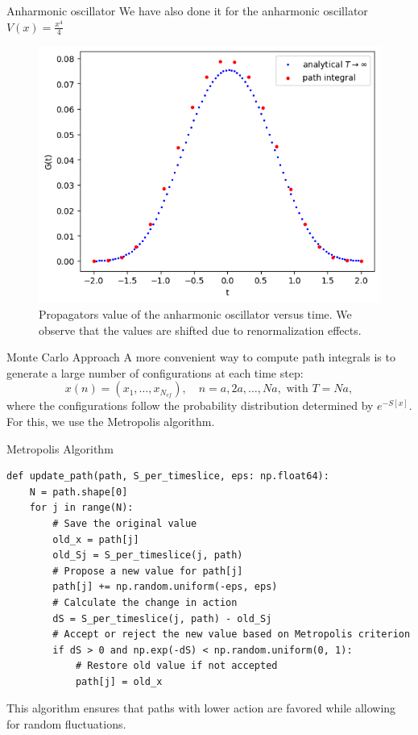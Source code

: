\documentclass{beamer}
\begin{document}
\begin{frame}{Anharmonic oscillator}
    We have also done it for the anharmonic oscillator $V(x) = \frac{x^4}{4}$
    \begin{figure}
        \centering
        \includegraphics[width=0.5\linewidth]{anharmonic_oscillator_numerical.png}
        \caption{Propagators value of the anharmonic oscillator versus time. We observe that the values are shifted due to renormalization effects.}
        \label{fig:enter-label}
    \end{figure}
\end{frame}
\begin{frame}{Monte Carlo Approach}
    A more convenient way to compute path integrals is to generate a large number of configurations at each time step:
    \[
    x(n) = (x_1, \dots, x_{N_{cf}}), \quad n = a, 2a, \dots, Na, \text{ with } T = Na,
    \]
    where the configurations follow the probability distribution determined by $e^{-S[x]}$. For this, we use the Metropolis algorithm.
\end{frame}

\begin{frame}[fragile]{Metropolis Algorithm}
        \begin{verbatim}
def update_path(path, S_per_timeslice, eps: np.float64):
    N = path.shape[0]
    for j in range(N):
        # Save the original value
        old_x = path[j]
        old_Sj = S_per_timeslice(j, path)
        # Propose a new value for path[j]
        path[j] += np.random.uniform(-eps, eps)
        # Calculate the change in action
        dS = S_per_timeslice(j, path) - old_Sj
        # Accept or reject the new value based on Metropolis criterion
        if dS > 0 and np.exp(-dS) < np.random.uniform(0, 1):
            # Restore old value if not accepted
            path[j] = old_x
    \end{verbatim}
    This algorithm ensures that paths with lower action are favored while allowing for random fluctuations.
\end{frame}
\end{document}

